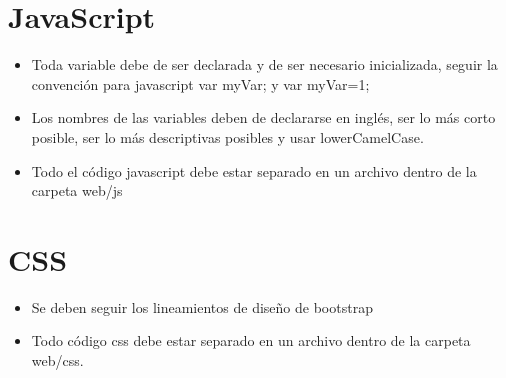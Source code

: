 \section{JavaScript}

\begin{itemize}
\item Toda variable debe de ser declarada y de ser necesario inicializada, seguir la convención para javascript var myVar; y var myVar=1;

\item Los nombres de las variables deben de declararse en inglés, ser lo más corto posible, ser lo más descriptivas posibles y usar lowerCamelCase.

\item Todo el código javascript debe estar separado en un archivo dentro de la carpeta web/js

\end{itemize}

\section{CSS}
\begin{itemize}
	\item Se deben seguir los lineamientos de diseño de bootstrap

	\item Todo código css debe estar separado en un archivo dentro de la carpeta web/css.

\end{itemize}
